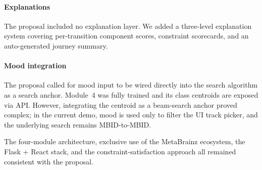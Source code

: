 \paragraph{Explanations} The proposal included no explanation layer. We added a three-level explanation system covering per-transition component scores, constraint scorecards, and an auto-generated journey summary.

\paragraph{Mood integration} The proposal called for mood input to be wired directly into the search algorithm as a search anchor. Module~4 was fully trained and its class centroids are exposed via API. However, integrating the centroid as a beam-search anchor proved complex; in the current demo, mood is used only to filter the UI track picker, and the underlying search remains MBID-to-MBID.

The four-module architecture, exclusive use of the MetaBrainz ecosystem, the Flask + React stack, and the constraint-satisfaction approach all remained consistent with the proposal.